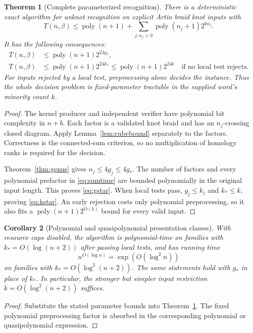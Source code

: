 \documentclass[11pt,letterpaper]{article}
\newtheorem{theorem}{Theorem}[section]
\newtheorem{corollary}[theorem]{Corollary}
\theoremstyle{definition}
\newcommand{\poly}{\operatorname{poly}}
\begin{document}
\begin{theorem}[Complete parameterized recognition]
\label{thm:fpt}
There is a deterministic exact algorithm for unknot recognition on explicit Artin braid knot inputs with
\begin{equation}
 T(n,\beta)\le\poly(n+1)+\sum_{j:n_j>0}\poly(n_j+1)2^{6n_j}.
 \label{eq:sumtime}
\end{equation}
It has the following consequences:
\begin{align}
 T(n,\beta)&\le\poly(n+1)2^{24g_*},\label{eq:gstar}\\
 T(n,\beta)&\le\poly(n+1)2^{24k_*}\le\poly(n+1)2^{24k}
 \quad\text{if no local test rejects.}\label{eq:kstar}
\end{align}
For inputs rejected by a local test, preprocessing alone decides the instance. Thus the whole decision problem is fixed-parameter tractable in the supplied word's minority count $k$.
\end{theorem}
\begin{proof}
The kernel producer and independent verifier have polynomial bit complexity in $n+b$. Each factor is a validated knot braid and has an $n_j$-crossing closed diagram. Apply Lemma~\ref{lem:cubebound} separately to the factors. Correctness is the connected-sum criterion, so no multiplication of homology ranks is required for the decision.

Theorem~\ref{thm:genus} gives $n_j\le4g_j\le4g_*$. The number of factors and every polynomial prefactor in \eqref{eq:sumtime} are bounded polynomially in the original input length. This proves \eqref{eq:gstar}. When local tests pass, $g_j\le k_j$ and $k_*\le k$, proving \eqref{eq:kstar}. An early rejection costs only polynomial preprocessing, so it also fits a $\poly(n+1)2^{O(k)}$ bound for every valid input.
\end{proof}

\begin{corollary}[Polynomial and quasipolynomial presentation classes]
\label{cor:qp}
With resource caps disabled, the algorithm is polynomial-time on families with $k_*=O(\log(n+2))$ after passing local tests, and has running time
\[
 n^{O(\log n)}=\exp(O(\log^2 n))
\]
on families with $k_*=O(\log^2(n+2))$. The same statements hold with $g_*$ in place of $k_*$. In particular, the stronger but simpler input restriction $k=O(\log^2(n+2))$ suffices.
\end{corollary}
\begin{proof}
Substitute the stated parameter bounds into Theorem~\ref{thm:fpt}. The fixed polynomial preprocessing factor is absorbed in the corresponding polynomial or quasipolynomial expression.
\end{proof}
\end{document}
